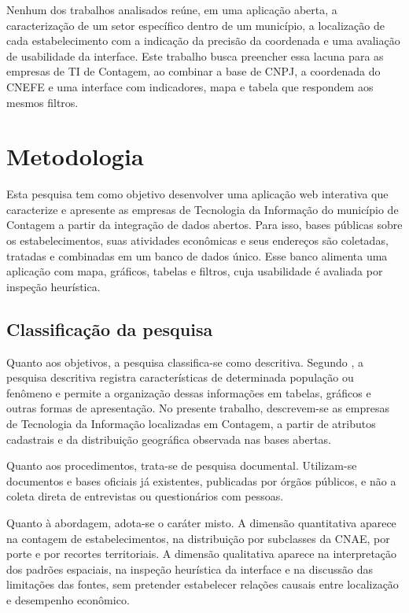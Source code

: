 Nenhum dos trabalhos analisados reúne, em uma aplicação aberta, a caracterização de um setor específico dentro de um município, a localização de cada estabelecimento com a indicação da precisão da coordenada e uma avaliação de usabilidade da interface.
Este trabalho busca preencher essa lacuna para as empresas de TI de Contagem, ao combinar a base de CNPJ, a coordenada do CNEFE e uma interface com indicadores, mapa e tabela que respondem aos mesmos filtros.

\section{Metodologia}

Esta pesquisa tem como objetivo desenvolver uma aplicação web interativa que caracterize e apresente as empresas de Tecnologia da Informação do município de Contagem a partir da integração de dados abertos.
Para isso, bases públicas sobre os estabelecimentos, suas atividades econômicas e seus endereços são coletadas, tratadas e combinadas em um banco de dados único.
Esse banco alimenta uma aplicação com mapa, gráficos, tabelas e filtros, cuja usabilidade é avaliada por inspeção heurística.

\subsection{Classificação da pesquisa}

Quanto aos objetivos, a pesquisa classifica-se como descritiva.
Segundo , a pesquisa descritiva registra características de determinada população ou fenômeno e permite a organização dessas informações em tabelas, gráficos e outras formas de apresentação.
No presente trabalho, descrevem-se as empresas de Tecnologia da Informação localizadas em Contagem, a partir de atributos cadastrais e da distribuição geográfica observada nas bases abertas.

Quanto aos procedimentos, trata-se de pesquisa documental.
Utilizam-se documentos e bases oficiais já existentes, publicadas por órgãos públicos, e não a coleta direta de entrevistas ou questionários com pessoas.

Quanto à abordagem, adota-se o caráter misto.
A dimensão quantitativa aparece na contagem de estabelecimentos, na distribuição por subclasses da CNAE, por porte e por recortes territoriais.
A dimensão qualitativa aparece na interpretação dos padrões espaciais, na inspeção heurística da interface e na discussão das limitações das fontes, sem pretender estabelecer relações causais entre localização e desempenho econômico.

